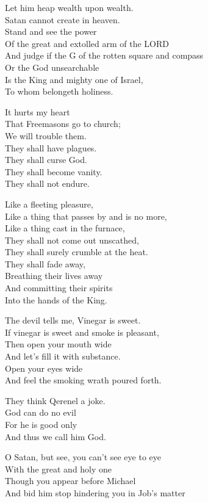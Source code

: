 \documentclass[
]{book}
\begin{document}
Let him heap wealth upon wealth.\\
Satan cannot create in heaven.\\
Stand and see the power\\
Of the great and extolled arm of the LORD\\
And judge if the G of the rotten square and compass\\
Or the God unsearchable\\
Is the King and mighty one of Israel,\\
To whom belongeth holiness.

It hurts my heart\\
That Freemasons go to church;\\
We will trouble them.\\
They shall have plagues.\\
They shall curse God.\\
They shall become vanity.\\
They shall not endure.

Like a fleeting pleasure,\\
Like a thing that passes by and is no more,\\
Like a thing cast in the furnace,\\
They shall not come out unscathed,\\
They shall surely crumble at the heat.\\
They shall fade away,\\
Breathing their lives away\\
And committing their spirits\\
Into the hands of the King.

The devil tells me, Vinegar is sweet.\\
If vinegar is sweet and smoke is pleasant,\\
Then open your mouth wide\\
And let's fill it with substance.\\
Open your eyes wide\\
And feel the smoking wrath poured forth.

They think Qerenel a joke.\\
God can do no evil\\
For he is good only\\
And thus we call him God.

O Satan, but see, you can't see eye to eye\\
With the great and holy one\\
Though you appear before Michael\\
And bid him stop hindering you in Job's matter
\end{document}
